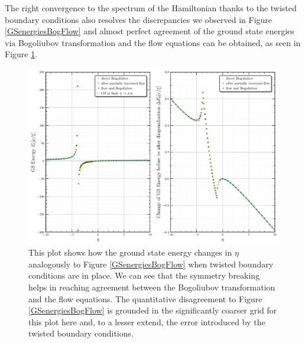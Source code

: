 The right convergence to the spectrum of the Hamiltonian thanks to the twisted boundary conditions also resolves the discrepancies we observed in Figure \ref{GSenergiesBogFlow} and almost perfect agreement of the ground state energies via Bogoliubov transformation and the flow equations can be obtained, as seen in Figure \ref{ConvergenceImprovementsTwisted}.
\begin{figure}[H]
    \centering
    \includegraphics[width=\textwidth]{figures/plots/PDF/GS_energies_bog_flow_comp_N=40.pdf}
    \caption[Ground state energy with twisted boundary conditions]{This plot shows how the ground state energy changes in $\eta$ analogously to Figure \ref{GSenergiesBogFlow} when twisted boundary conditions are in place. We can see that the symmetry breaking helps in reaching agreement between the Bogoliubov transformation and the flow equations. The quantitative disagreement to Figure \ref{GSenergiesBogFlow} is grounded in the significantly coarser grid for this plot here and, to a lesser extend, the error introduced by the twisted boundary conditions.}
    \label{ConvergenceImprovementsTwisted}
\end{figure}
